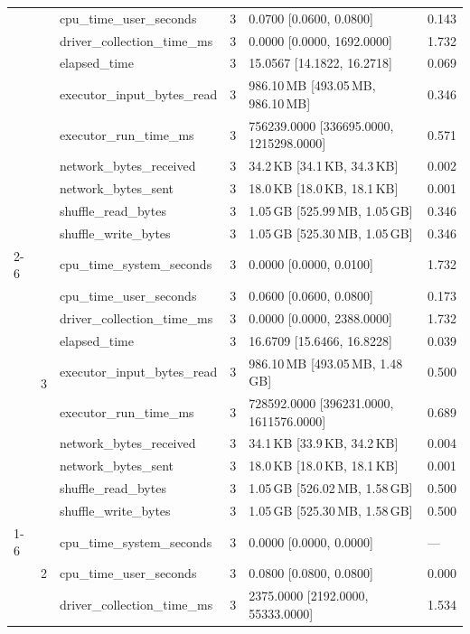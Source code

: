 \begin{tabular}{lllrll}
 &  & cpu_time_user_seconds & 3 & 0.0700 [0.0600, 0.0800] & 0.143 \\
 &  & driver_collection_time_ms & 3 & 0.0000 [0.0000, 1692.0000] & 1.732 \\
 &  & elapsed_time & 3 & 15.0567 [14.1822, 16.2718] & 0.069 \\
 &  & executor_input_bytes_read & 3 & 986.10\,MB [493.05\,MB, 986.10\,MB] & 0.346 \\
 &  & executor_run_time_ms & 3 & 756239.0000 [336695.0000, 1215298.0000] & 0.571 \\
 &  & network_bytes_received & 3 & 34.2\,KB [34.1\,KB, 34.3\,KB] & 0.002 \\
 &  & network_bytes_sent & 3 & 18.0\,KB [18.0\,KB, 18.1\,KB] & 0.001 \\
 &  & shuffle_read_bytes & 3 & 1.05\,GB [525.99\,MB, 1.05\,GB] & 0.346 \\
 &  & shuffle_write_bytes & 3 & 1.05\,GB [525.30\,MB, 1.05\,GB] & 0.346 \\
\cline{2-6}
 & \multirow[t]{10}{*}{3} & cpu_time_system_seconds & 3 & 0.0000 [0.0000, 0.0100] & 1.732 \\
 &  & cpu_time_user_seconds & 3 & 0.0600 [0.0600, 0.0800] & 0.173 \\
 &  & driver_collection_time_ms & 3 & 0.0000 [0.0000, 2388.0000] & 1.732 \\
 &  & elapsed_time & 3 & 16.6709 [15.6466, 16.8228] & 0.039 \\
 &  & executor_input_bytes_read & 3 & 986.10\,MB [493.05\,MB, 1.48\,GB] & 0.500 \\
 &  & executor_run_time_ms & 3 & 728592.0000 [396231.0000, 1611576.0000] & 0.689 \\
 &  & network_bytes_received & 3 & 34.1\,KB [33.9\,KB, 34.2\,KB] & 0.004 \\
 &  & network_bytes_sent & 3 & 18.0\,KB [18.0\,KB, 18.1\,KB] & 0.001 \\
 &  & shuffle_read_bytes & 3 & 1.05\,GB [526.02\,MB, 1.58\,GB] & 0.500 \\
 &  & shuffle_write_bytes & 3 & 1.05\,GB [525.30\,MB, 1.58\,GB] & 0.500 \\
\cline{1-6} \cline{2-6}
\multirow[t]{20}{*}{national-scale-spatial-join-databricks-broadcast-16-nodes-large} & \multirow[t]{10}{*}{2} & cpu_time_system_seconds & 3 & 0.0000 [0.0000, 0.0000] & --- \\
 &  & cpu_time_user_seconds & 3 & 0.0800 [0.0800, 0.0800] & 0.000 \\
 &  & driver_collection_time_ms & 3 & 2375.0000 [2192.0000, 55333.0000] & 1.534 \\

\end{tabular}
